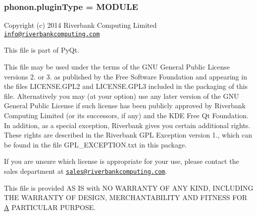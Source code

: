 \subsubsection[{plugin\+Type}]{\setlength{\rightskip}{0pt plus 5cm}phonon.\+plugin\+Type = M\+O\+D\+U\+L\+E}\label{namespacephonon_a3005f99b62fa5713c42127f9b598a04b}


Copyright (c) 2014 Riverbank Computing Limited \href{mailto:info@riverbankcomputing.com}{\tt info@riverbankcomputing.\+com} 

This file is part of Py\+Qt.

This file may be used under the terms of the G\+N\+U General Public License versions 2. or 3. as published by the Free Software Foundation and appearing in the files L\+I\+C\+E\+N\+S\+E.\+G\+P\+L2 and L\+I\+C\+E\+N\+S\+E.\+G\+P\+L3 included in the packaging of this file. Alternatively you may (at your option) use any later version of the G\+N\+U General Public License if such license has been publicly approved by Riverbank Computing Limited (or its successors, if any) and the K\+D\+E Free Qt Foundation. In addition, as a special exception, Riverbank gives you certain additional rights. These rights are described in the Riverbank G\+P\+L Exception version 1., which can be found in the file G\+P\+L\+\_\+\+E\+X\+C\+E\+P\+T\+I\+O\+N.\+txt in this package.

If you are unsure which license is appropriate for your use, please contact the sales department at \href{mailto:sales@riverbankcomputing.com}{\tt sales@riverbankcomputing.\+com}.

This file is provided A\+S I\+S with N\+O W\+A\+R\+R\+A\+N\+T\+Y O\+F A\+N\+Y K\+I\+N\+D, I\+N\+C\+L\+U\+D\+I\+N\+G T\+H\+E W\+A\+R\+R\+A\+N\+T\+Y O\+F D\+E\+S\+I\+G\+N, M\+E\+R\+C\+H\+A\+N\+T\+A\+B\+I\+L\+I\+T\+Y A\+N\+D F\+I\+T\+N\+E\+S\+S F\+O\+R \hyperlink{classA}{A} P\+A\+R\+T\+I\+C\+U\+L\+A\+R P\+U\+R\+P\+O\+S\+E. 